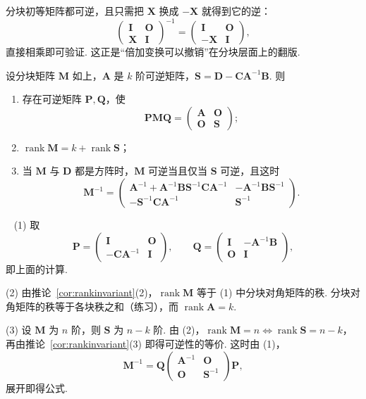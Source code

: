 \documentclass[lang=cn,10.5pt,scheme=chinese,toc=twocol,section,chinesefont=nofont,
twoside,citestyle=gb7714-2015,bibstyle=gb7714-2015]{elegantbook}
\newcommand{\vv}[1]{\boldsymbol{#1}}
\numberwithin{equation}{section}   %
\newcommand{\rk}{\operatorname{rank}}       %
\newcommand*{\lnlabel}[1]{{\sffamily\bfseries\color{black}#1}}
\renewenvironment{proof}{%
	\par\noindent\lnlabel{\proofname}\;\ \color{black!90}\cfs}{\par}
\begin{document}
分块初等矩阵都可逆，且只需把 $\vv X$ 换成 $-\vv X$ 就得到它的逆：
\[
  \begin{pmatrix}
    \vv I & \vv O \\ \vv X&\vv I
  \end{pmatrix}
  ^{-1}=
  \begin{pmatrix}
    \vv I & \vv O \\ -\vv X&\vv I
  \end{pmatrix}
  ,
\]
直接相乘即可验证. 这正是“倍加变换可以撤销”在分块层面上的翻版.

\begin{theorem}[打洞]\label{thm:holepunch}
  设分块矩阵 $\vv M$ 如上，$\vv A$ 是 $k$ 阶可逆矩阵，$\vv S=\vv D-\vv C\vv A^{-1}\vv B$. 则
  \begin{enumerate}
    \item 存在可逆矩阵 $\vv P,\vv Q$，使
          \[\vv{PMQ}=
            \begin{pmatrix}
              \vv A & \vv O \\ \vv O&\vv S
            \end{pmatrix}
            ;\]
    \item $\rk\vv M=k+\rk\vv S$；
    \item 当 $\vv M$ 与 $\vv D$ 都是方阵时，$\vv M$ 可逆当且仅当 $\vv S$ 可逆，且这时
          \[
            \vv M^{-1}=
            \begin{pmatrix}
              \vv A^{-1}+\vv A^{-1}\vv B\vv S^{-1}\vv C\vv A^{-1} & -\vv A^{-1}\vv B\vv S^{-1} \\ -\vv S^{-1}\vv C\vv A^{-1}&\vv S^{-1}
            \end{pmatrix}
            .
          \]
  \end{enumerate}
\end{theorem}
\begin{proof}
  (1) 取
  \[\vv P=
    \begin{pmatrix}
      \vv I & \vv O \\ -\vv C\vv A^{-1}&\vv I
    \end{pmatrix}
    ,\qquad \vv Q=
    \begin{pmatrix}
      \vv I & -\vv A^{-1}\vv B \\ \vv O&\vv I
    \end{pmatrix}
    ,\]
  即上面的计算.

  (2) 由推论~\ref{cor:rankinvariant}(2)，$\rk\vv M$ 等于 (1) 中分块对角矩阵的秩. 分块对角矩阵的秩等于各块秩之和（练习），而 $\rk\vv A=k$.

  (3) 设 $\vv M$ 为 $n$ 阶，则 $\vv S$ 为 $n-k$ 阶. 由 (2)，$\rk\vv M=n\iff\rk\vv S=n-k$，再由推论~\ref{cor:rankinvariant}(3) 即得可逆性的等价. 这时由 (1)，
  \[\vv M^{-1}=\vv Q
    \begin{pmatrix}
      \vv A^{-1} & \vv O \\ \vv O&\vv S^{-1}
    \end{pmatrix}
    \vv P,\]
  展开即得公式.
\end{proof}
\end{document}
